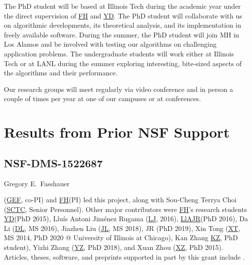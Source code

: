 \documentclass[11pt]{NSFamsart}
\newcommand{\FH}{\hyperlink{FHlink}{FH}\xspace}
\newcommand{\SCTC}{\hyperlink{SCTClink}{SCTC}\xspace}
\newcommand{\GEF}{\hyperlink{GEFlink}{GEF}\xspace}
\newcommand{\YD}{\hyperlink{YDlink}{YD}\xspace}
\newcommand{\LlAJR}{\hyperlink{LlAJRlink}{LlAJR}\xspace}
\newcommand{\LJ}{\hyperlink{LJlink}{LJ}\xspace}
\newcommand{\XT}{\hyperlink{XTlink}{XT}\xspace}
\newcommand{\KZ}{\hyperlink{KZlink}{KZ}\xspace}
\newcommand{\DL}{\hyperlink{DLlink}{DL}\xspace}
\newcommand{\XZ}{\hyperlink{XZlink}{XZ}\xspace}
\newcommand{\JL}{\hyperlink{JLlink}{JL}\xspace}
\newcommand{\YZ}{\hyperlink{YZlink}{YZ}\xspace}
\begin{document}
The PhD student will be based at Illinois Tech during the academic year under the direct supervision of \FH and \YD. The PhD student will collaborate with us on algorithmic developments, its theoretical analysis, and its implementation in freely available software. During the summer, the PhD student will join MH in Los Alamos and be involved with testing our algorithms on challenging application problems. The undergraduate students will work either at Illinois Tech or at LANL during the summer exploring interesting, bite-sized aspects of the algorithms and their performance.

Our research groups will meet regularly via video conference and in person a couple of times per year at one of our campuses or at conferences.

\section{Results from Prior NSF Support} \label{sec:prior_work}

\subsection{NSF-DMS-1522687
} \label{sec:PreviousFred}

\hypertarget{GEFlink}{Gregory E.\ Fasshauer} (\GEF, co-PI) and \FH (PI) led this project, along with  \hypertarget{SCTClink}{Sou-Cheng Terrya Choi} (\SCTC, Senior Personnel).  Other major contributors were \FH's research students  \YD (PhD 2015), \hypertarget{LlAJRlink}{Llu\'is Antoni Jim\'enez Rugama} (\LJ, 2016),
\LlAJR (PhD 2016), \hypertarget{DLlink}{Da Li} (\DL, MS 2016), \hypertarget{JLlink}{Jiazhen Liu} (\JL, MS 2018), JR (PhD 2019), \hypertarget{XTlink}{Xin Tong} (\XT, MS 2014, PhD 2020 @ University of Illinois at Chicago), \hypertarget{KZlink}{Kan Zhang} \KZ, PhD student), \hypertarget{YZlink}{Yizhi Zhang} (\YZ, PhD 2018), and \hypertarget{XZlink}{Xuan Zhou} (\XZ, PhD 2015).  Articles, theses,
software, and preprints supported in
part by this
grant
include
\cite{ala_augmented_2017,
	ChoEtal17a,
	ChoEtal20a,
	Din15a,
	DinHic20a,
	GilEtal16a,
	Hic17a,
	HicJag18b,
	HicJim16a,
	HicEtal18a,
	HicEtal17a,
	HicKriWoz19a,
	RatHic19a,
	GilJim16b,
	JimHic16a,
	JohFasHic18a,
	Li16a,
	Liu17a,
	MarEtal18a,
	mccourt_stable_2017,
	MCCEtal19a,
	mishra_hybrid_2018,
	MisEtal19a,
	rashidinia_stable_2016,
	rashidinia_stable_2018,
	Zha18a,
	Zha17a,
	Zho15a,
	ZhoHic15a}.
\end{document}
